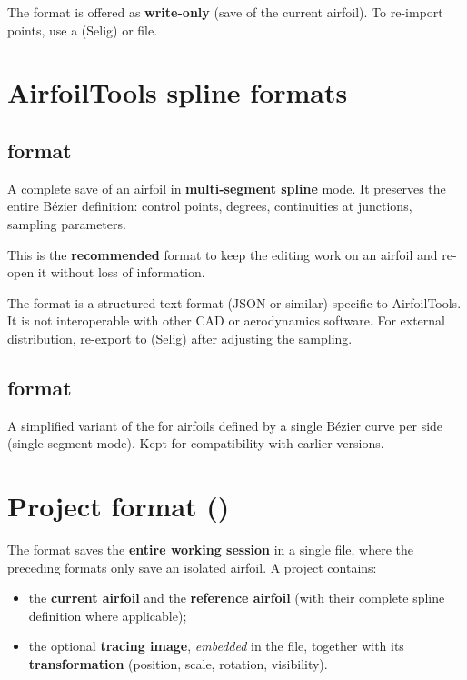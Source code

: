 \begin{noteinfo}
The  format is offered as \textbf{write-only}
(save of the current airfoil). To re-import points,
use a  (Selig) or  file.
\end{noteinfo}

\section{AirfoilTools spline formats}

\subsection{ format}

A complete save of an airfoil in \textbf{multi-segment
spline} mode. It preserves the entire Bézier definition:
control points, degrees, continuities at junctions, sampling
parameters.

This is the \textbf{recommended} format to keep the editing
work on an airfoil and re-open it without loss of information.

\begin{noteinfo}
The  format is a structured text format (JSON
or similar) specific to AirfoilTools. It is not
interoperable with other CAD or aerodynamics software.
For external distribution, re-export to
 (Selig) after adjusting the sampling.
\end{noteinfo}

\subsection{ format}

A simplified variant of the  for airfoils defined
by a single Bézier curve per side (single-segment mode).
Kept for compatibility with earlier versions.

\section{Project format ()}
\label{sec:aftproj}

The  format saves the \textbf{entire working
session} in a single file, where the preceding formats
only save an isolated airfoil. A project contains:

\begin{itemize}
    \item the \textbf{current airfoil} and the \textbf{reference
        airfoil} (with their complete spline definition where
        applicable);
    \item the optional \textbf{tracing image}, \emph{embedded}
        in the file, together with its \textbf{transformation}
        (position, scale, rotation, visibility).
\end{itemize}

